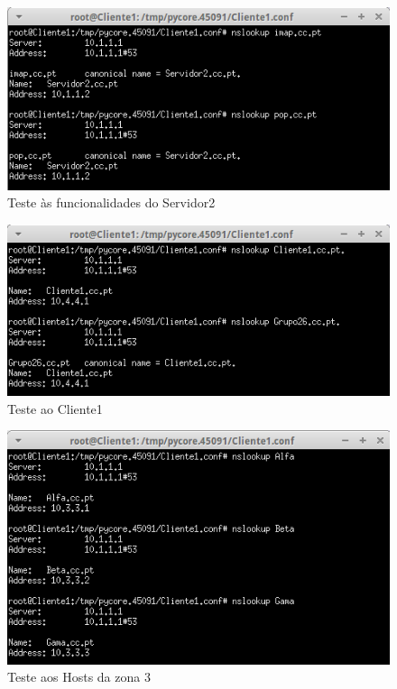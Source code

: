 \documentclass{llncs}
\begin{document}
\begin{figure}[H]
\begin{center}
\includegraphics[scale=0.75]{teste9.png}
\end{center}
\caption{\label{fig:t9}Teste às funcionalidades do Servidor2}
\end{figure}

\begin{figure}[H]
\begin{center}
\includegraphics[scale=0.75]{teste10.png}
\end{center}
\caption{\label{fig:t10}Teste ao Cliente1}
\end{figure}

\begin{figure}[H]
\begin{center}
\includegraphics[scale=0.75]{teste11.png}
\end{center}
\caption{\label{fig:t11}Teste aos Hosts da zona 3}
\end{figure}
\end{document}
